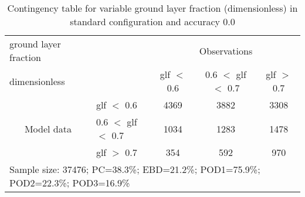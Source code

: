 \begin{table}[]
\begin{center}
\begin{tabular}{llccc}
\hline
{ground layer fraction}                                       &                                                    & \multicolumn{3}{c}{Observations}                 \\
{dimensionless}                                       &                             & glf $<$ 0.6   & 0.6 $<$ glf $<$ 0.7 & glf $>$ 0.7 \\
\hline
\multicolumn{1}{c}{\multirow{3}{*}{Model data}}  & glf $<$ 0.6             & 4369                & 3882                       & 3308              \\
                                                 & 0.6  $<$ glf $<$ 0.7 & 1034                & 1283                       & 1478              \\
                                                 & glf $>$ 0.7             & 354                & 592                       & 970              \\
\hline
\multicolumn{5}{l}{Sample size: 37476; PC=38.3\%; EBD=21.2\%; POD1=75.9\%; POD2=22.3\%; POD3=16.9\%}
\end{tabular}
\end{center}
\caption{Contingency table for variable ground layer fraction (dimensionless) in standard configuration and accuracy 0.0}
\label{tab:contingencyglfBEF}
\end{table}
